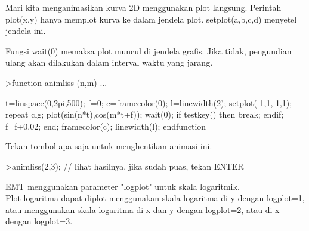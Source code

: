 \documentclass[a4paper,10pt]{article}
\begin{document}
\begin{eulernotebook}
\begin{eulercomment}
\begin{eulercomment}
\begin{eulercomment}
\begin{eulercomment}
\begin{eulercomment}
\begin{eulercomment}
\begin{eulercomment}
\begin{eulercomment}
\begin{eulercomment}
\begin{eulercomment}
\begin{eulercomment}
\begin{eulercomment}
\begin{eulercomment}
\begin{eulercomment}
\begin{eulercomment}
\begin{eulercomment}
\begin{eulercomment}
\begin{eulercomment}
\begin{eulercomment}
\begin{eulercomment}
\begin{eulercomment}
\begin{eulercomment}
\begin{eulercomment}
\begin{eulercomment}
\begin{eulercomment}
\begin{eulercomment}
\begin{eulercomment}
\begin{eulercomment}
\begin{eulercomment}
\begin{eulercomment}
\begin{eulercomment}
\begin{eulercomment}
\begin{eulercomment}
\begin{eulercomment}
\begin{eulercomment}
\begin{eulercomment}
\begin{eulercomment}
Mari kita menganimasikan kurva 2D menggunakan plot langsung. Perintah
plot(x,y) hanya memplot kurva ke dalam jendela plot. setplot(a,b,c,d)
menyetel jendela ini.

Fungsi wait(0) memaksa plot muncul di jendela grafis. Jika tidak,
pengundian ulang akan dilakukan dalam interval waktu yang jarang.
\end{eulercomment}
\begin{eulerprompt}
>function animliss (n,m) ...
\end{eulerprompt}
\begin{eulerudf}
  t=linspace(0,2pi,500);
  f=0;
  c=framecolor(0);
  l=linewidth(2);
  setplot(-1,1,-1,1);
  repeat
    clg;
    plot(sin(n*t),cos(m*t+f));
    wait(0);
    if testkey() then break; endif;
    f=f+0.02;
  end;
  framecolor(c);
  linewidth(l);
  endfunction
\end{eulerudf}
\begin{eulercomment}
Tekan tombol apa saja untuk menghentikan animasi ini.
\end{eulercomment}
\begin{eulerprompt}
>animliss(2,3); // lihat hasilnya, jika sudah puas, tekan ENTER
\end{eulerprompt}
\begin{eulercomment}
EMT menggunakan parameter "logplot" untuk skala logaritmik.\\
Plot logaritma dapat diplot menggunakan skala logaritma di y dengan
logplot=1, atau menggunakan skala logaritma di x dan y dengan
logplot=2, atau di x dengan logplot=3.


\end{eulercomment}
\end{eulercomment}
\end{eulercomment}
\end{eulercomment}
\end{eulercomment}
\end{eulercomment}
\end{eulercomment}
\end{eulercomment}
\end{eulercomment}
\end{eulercomment}
\end{eulercomment}
\end{eulercomment}
\end{eulercomment}
\end{eulercomment}
\end{eulercomment}
\end{eulercomment}
\end{eulercomment}
\end{eulercomment}
\end{eulercomment}
\end{eulercomment}
\end{eulercomment}
\end{eulercomment}
\end{eulercomment}
\end{eulercomment}
\end{eulercomment}
\end{eulercomment}
\end{eulercomment}
\end{eulercomment}
\end{eulercomment}
\end{eulercomment}
\end{eulercomment}
\end{eulercomment}
\end{eulercomment}
\end{eulercomment}
\end{eulercomment}
\end{eulercomment}
\end{eulercomment}
\end{eulernotebook}
\end{document}
